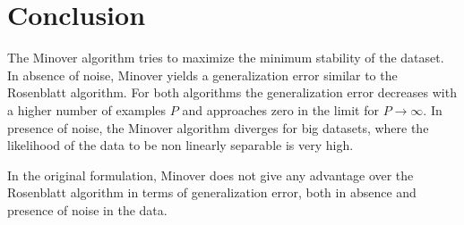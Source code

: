 \section{Conclusion}
\label{sec:conclusion}

The Minover algorithm tries to maximize the minimum stability of the dataset.
In absence of noise, Minover yields a generalization error similar to the Rosenblatt algorithm.
For both algorithms the generalization error decreases with a higher number of examples $P$ and approaches zero in the limit for $P \to \infty$.
In presence of noise, the Minover algorithm diverges for big datasets, where the likelihood of the data to be non linearly separable is very high.

In the original formulation, Minover does not give any advantage over the Rosenblatt algorithm in terms of generalization error, both in absence and presence of noise in the data.
